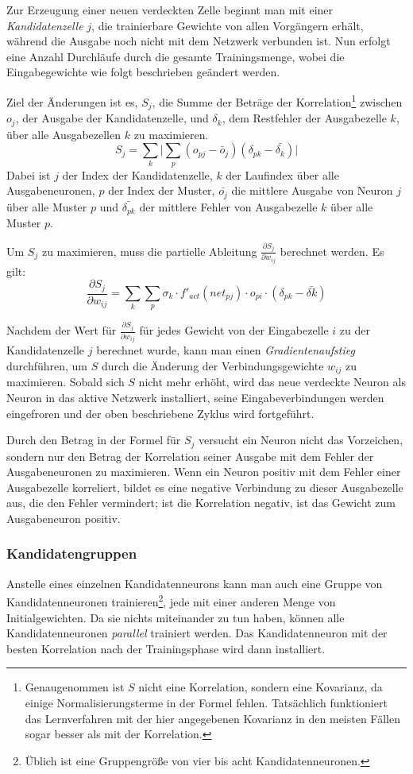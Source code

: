 Zur Erzeugung einer neuen verdeckten Zelle beginnt man mit einer \emph{Kandidatenzelle} $j$, die trainierbare Gewichte von allen Vorgängern erhält, während die Ausgabe noch nicht mit dem Netzwerk verbunden ist.
Nun erfolgt eine Anzahl Durchläufe durch die gesamte Trainingsmenge, wobei die Eingabegewichte wie folgt beschrieben geändert werden.

Ziel der Änderungen ist es, $S_j$, die Summe der Beträge der Korrelation\footnote{Genaugenommen ist $S$ nicht eine Korrelation, sondern eine Kovarianz, da einige Normalisierungsterme in der Formel fehlen. Tatsächlich funktioniert das Lernverfahren mit der hier angegebenen Kovarianz in den meisten Fällen sogar besser als mit der Korrelation.} zwischen $o_j$, der Ausgabe der Kandidatenzelle, und $\delta_k$,
dem Restfehler der Ausgabezelle $k$, über alle Ausgabezellen $k$ zu maximieren.
\[
	S_j = \sum_k \big | \sum_p (o_{pj} - \bar{o}_j) (\delta_{pk} - \bar{\delta_k}) \big |
\]
Dabei ist $j$ der Index der Kandidatenzelle, $k$ der Laufindex über alle Ausgabeneuronen, $p$ der Index der Muster, $\bar{o_j}$ die mittlere Ausgabe von Neuron $j$ über alle Muster $p$ und $\bar{\delta_{pk}}$ der mittlere Fehler von Ausgabezelle $k$ über alle Muster $p$.

Um $S_j$ zu maximieren, muss die partielle Ableitung $\frac{\partial S_j}{\partial w_{ij}}$ berechnet werden. Es gilt:
\[
	\frac{\partial S_j}{\partial w_{ij}} = 
		\sum_k \sum_p \sigma_k \cdot f'_{act}(net_{pj}) \cdot
		o_{pi} \cdot (\delta_{pk} - \bar{\delta{k}})
\]

Nachdem der Wert für $\frac{\partial S_j}{\partial w_{ij}}$ für jedes Gewicht von der Eingabezelle $i$ zu der Kandidatenzelle $j$ berechnet wurde, kann man einen \emph{Gradientenaufstieg} durchführen, um $S$ durch die Änderung der Verbindungsgewichte $w_{ij}$ zu maximieren.
Sobald sich $S$ nicht mehr erhöht, wird das neue verdeckte Neuron als Neuron in das aktive Netzwerk installiert, seine Eingabeverbindungen werden eingefroren und der oben beschriebene Zyklus wird fortgeführt.

Durch den Betrag in der Formel für $S_j$ versucht ein Neuron nicht das Vorzeichen, sondern nur den Betrag der Korrelation seiner Ausgabe mit dem Fehler der Ausgabeneuronen zu maximieren.
Wenn ein Neuron positiv mit dem Fehler einer Ausgabezelle korreliert, bildet es eine negative Verbindung zu dieser Ausgabezelle aus, die den Fehler vermindert; ist die Korrelation negativ, ist das Gewicht zum Ausgabeneuron positiv.

\subsubsection*{Kandidatengruppen}
Anstelle eines einzelnen Kandidatenneurons kann man auch eine Gruppe von Kandidatenneuronen trainieren\footnote{Üblich ist eine Gruppengröße von vier bis acht Kandidatenneuronen.}, jede mit einer anderen Menge von Initialgewichten. Da sie nichts miteinander zu tun haben, können alle Kandidatenneuronen \emph{parallel} trainiert werden.
Das Kandidatenneuron mit der besten Korrelation nach der Trainingsphase wird dann installiert.

